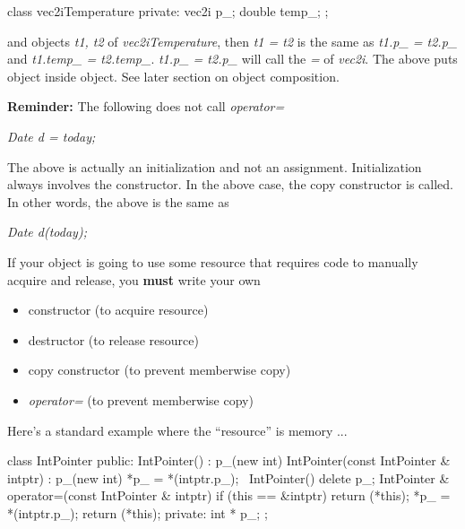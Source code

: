 \begin{consolethree}[escapeinside=||]
class vec2iTemperature
{
private:
    vec2i p_;
    double temp_;
};
\end{consolethree}

and objects \textit{t1, t2} of \textit{vec2iTemperature}, then \textit{t1 =
t2} is the same as \textit{t1.p\_ = t2.p\_} and \textit{t1.temp\_ =
t2.temp\_}. \textit{t1.p\_ = t2.p\_} will call the \textit{=} of
\textit{vec2i}. The above puts object inside object. See later section on
object composition.


\newpage{}

\textbf{Reminder:} The following does not call \textit{operator=}

\textit{Date d = today;}

The above is actually an initialization and not an assignment.
Initialization always involves the constructor. In the above case, the
copy constructor is called. In other words, the above is the same as

\textit{Date d(today);}


\newpage{}

If your object is going to use some resource that requires code to
manually acquire and release, you \textbf{must} write your own

\begin{itemize}
\item constructor (to acquire resource)
\item destructor (to release resource)
\item copy constructor (to prevent memberwise copy)
\item \textit{operator=} (to prevent memberwise copy)
\end{itemize}

Here's a standard example where the ``resource'' is
memory ...

\begin{consolethree}[escapeinside=||]
class IntPointer
{
public:
    IntPointer()
        : p_(new int)
    {}
    IntPointer(const IntPointer & intptr)
        : p_(new int)
    {
        *p_ = *(intptr.p_);
    }
    ~IntPointer() { delete p_; }
    IntPointer & operator=(const IntPointer & intptr)
    {
        if (this == &intptr)
        {
            return (*this);
        }
        *p_ = *(intptr.p_);
        return (*this);
    }
private:
    int * p_;
};
\end{consolethree}

